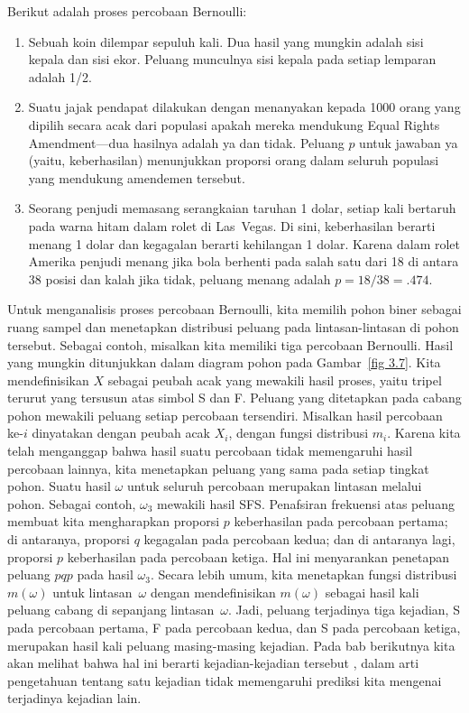 
\begin{example}\label{exam 3.9} Berikut adalah proses percobaan Bernoulli:
\begin{enumerate}
\item Sebuah koin dilempar sepuluh kali.  Dua hasil yang mungkin adalah sisi kepala dan
sisi ekor.  Peluang munculnya sisi kepala pada setiap lemparan adalah 1/2.
\item Suatu jajak pendapat dilakukan dengan menanyakan kepada 1000 orang yang dipilih
secara acak dari populasi apakah mereka mendukung Equal Rights Amendment---dua hasilnya
adalah ya dan tidak.  Peluang $p$ untuk jawaban ya (yaitu, keberhasilan) menunjukkan
proporsi orang dalam seluruh populasi yang mendukung amendemen tersebut.
\item Seorang penjudi memasang serangkaian taruhan 1 dolar, setiap kali bertaruh pada
warna hitam dalam rolet di Las~Vegas.  Di sini, keberhasilan berarti menang 1 dolar dan
kegagalan berarti kehilangan 1 dolar.  Karena dalam rolet Amerika penjudi menang jika
bola berhenti pada salah satu dari 18 di antara 38 posisi dan kalah jika tidak, peluang
menang adalah $p = 18/38 =
.474$.
\end{enumerate}
\end{example}

Untuk menganalisis proses percobaan Bernoulli, kita memilih pohon biner sebagai ruang
sampel dan menetapkan distribusi peluang pada lintasan-lintasan di pohon tersebut.
Sebagai contoh, misalkan kita memiliki tiga percobaan Bernoulli.  Hasil yang mungkin
ditunjukkan dalam diagram pohon pada Gambar~\ref{fig 3.7}.  Kita mendefinisikan $X$
sebagai peubah acak yang mewakili hasil proses, yaitu tripel terurut yang tersusun atas
simbol S dan F.  Peluang yang ditetapkan pada cabang pohon mewakili peluang setiap percobaan
tersendiri.  Misalkan hasil percobaan ke-$i$ dinyatakan dengan peubah acak $X_i$, dengan
fungsi distribusi $m_i$.  Karena kita telah menganggap bahwa hasil suatu percobaan tidak
memengaruhi hasil percobaan lainnya, kita menetapkan peluang yang sama pada setiap
tingkat pohon.  Suatu hasil $\omega$ untuk seluruh percobaan merupakan lintasan melalui
pohon.  Sebagai contoh, $\omega_3$ mewakili hasil SFS.  Penafsiran frekuensi atas
peluang membuat kita mengharapkan proporsi $p$ keberhasilan pada percobaan pertama; di
antaranya, proporsi $q$ kegagalan pada percobaan kedua; dan di antaranya lagi, proporsi
$p$ keberhasilan pada percobaan ketiga.  Hal ini menyarankan penetapan peluang $pqp$
pada hasil $\omega_3$.  Secara lebih umum, kita menetapkan fungsi distribusi
$m(\omega)$ untuk lintasan~$\omega$ dengan mendefinisikan $m(\omega)$ sebagai hasil kali
peluang cabang di sepanjang lintasan~$\omega$.  Jadi, peluang terjadinya tiga kejadian,
S pada percobaan pertama, F pada percobaan kedua, dan S pada percobaan ketiga, merupakan
hasil kali peluang masing-masing kejadian.  Pada bab berikutnya kita akan melihat bahwa
hal ini berarti kejadian-kejadian tersebut , dalam arti pengetahuan
tentang satu kejadian tidak memengaruhi prediksi kita mengenai terjadinya kejadian lain.

